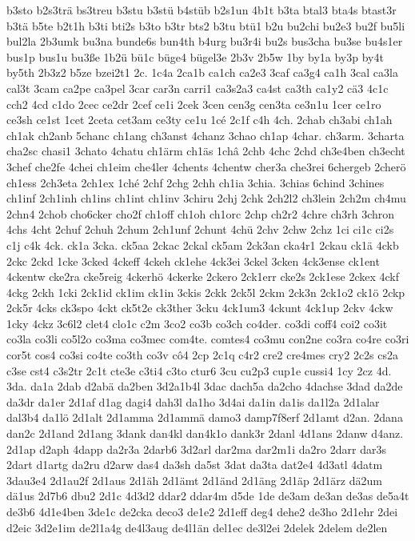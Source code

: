 {b3sto
b2s3trä
bs3treu
b3stu
b3stü
b4stüb
b2s1un
4b1t
b3ta
btal3
bta4s
btast3r
b3tä
b5te
b2t1h
b3ti
bti2s
b3to
b3tr
bts2
b3tu
btü1
b2u
bu2chi
bu2e3
bu2f
bu5li
bul2la
2b3umk
bu3na
bunde6s
bun4th
b4urg
bu3r4i
bu2s
bus3cha
bu3se
bu4s1er
bus1p
bus1u
bu3ße
1b2ü
bü1c
büge4
bügel3e
2b3v
2b5w
1by
by1a
by3p
by4t
by5th
2b3z2
b5ze
bzei2t1
2c.
1c4a
2ca1b
ca1ch
ca2e3
3caf
ca3g4
ca1h
3cal
ca3la
cal3t
3cam
ca2pe
ca3pel
3car
car3n
carri1
ca3s2a3
ca4st
ca3th
ca1y2
cä3
4c1c
cch2
4cd
c1do
2cec
ce2dr
2cef
ce1i
2cek
3cen
cen3g
cen3ta
ce3n1u
1cer
ce1ro
ce3sh
ce1st
1cet
2ceta
cet3am
ce3ty
ce1u
1cé
2c1f
c4h
4ch.
2chab
ch3abi
ch1ah
ch1ak
ch2anb
5chanc
ch1ang
ch3anst
4chanz
3chao
ch1ap
4char.
ch3arm.
3charta
cha2sc
chasi1
3chato
4chatu
ch1ärm
ch1äs
1châ
2chb
4chc
2chd
ch3e4ben
ch3echt
3chef
che2fe
4chei
ch1eim
che4ler
4chents
4chentw
cher3a
che3rei
6chergeb
2cherö
ch1ess
2ch3eta
2ch1ex
1ché
2chf
2chg
2chh
ch1ia
3chia.
3chias
6chind
3chines
ch1inf
2ch1inh
ch1ins
ch1int
ch1inv
3chiru
2chj
2chk
2ch2l2
ch3lein
2ch2m
ch4mu
2chn4
2chob
cho6cker
cho2f
ch1off
ch1oh
ch1orc
2chp
ch2r2
4chre
ch3rh
3chron
4chs
4cht
2chuf
2chuh
2chum
2ch1unf
2chunt
4chü
2chv
2chw
2chz
1ci
ci1c
ci2s
c1j
c4k
4ck.
ck1a
3cka.
ck5aa
2ckac
2ckal
ck5am
2ck3an
cka4r1
2ckau
ck1ä
4ckb
2ckc
2ckd
1cke
3cked
4ckeff
4ckeh
ck1ehe
4ck3ei
3ckel
3cken
4ck3ense
ck1ent
4ckentw
cke2ra
cke5reig
4ckerhö
4ckerke
2ckero
2ck1err
cke2s
2ck1ese
2ckex
4ckf
4ckg
2ckh
1cki
2ck1id
ck1im
ck1in
3ckis
2ckk
2ck5l
2ckm
2ck3n
2ck1o2
ck1ö
2ckp
2ck5r
4cks
ck3spo
4ckt
ck5t2e
ck3ther
3cku
4ck1um3
4ckunt
4ck1up
2ckv
4ckw
1cky
4ckz
3c6l2
clet4
clo1c
c2m
3co2
co3b
co3ch
co4der.
co3di
coff4
coi2
co3it
co3la
co3li
co5l2o
co3ma
co3mec
com4te.
comtes4
co3mu
con2ne
co3ra
co4re
co3ri
cor5t
cos4
co3si
co4te
co3th
co3v
cô4
2cp
2c1q
c4r2
cre2
cre4mes
cry2
2c2s
cs2a
c3se
cst4
c3s2tr
2c1t
cte3e
c3ti4
c3to
ctur6
3cu
cu2p3
cup1e
cussi4
1cy
2cz
4d.
3da.
da1a
2dab
d2abä
da2ben
3d2a1b4l
3dac
dach5a
da2cho
4dachse
3dad
da2de
da3dr
da1er
2d1af
d1ag
dagi4
dah3l
da1ho
3d4ai
da1in
da1is
da1l2a
2d1alar
dal3b4
da1lö
2d1alt
2d1amma
2d1ammä
damo3
damp7f8erf
2d1amt
d2an.
2dana
dan2c
2d1and
2d1ang
3dank
dan4kl
dan4k1o
dank3r
2danl
4d1ans
2danw
d4anz.
2d1ap
d2aph
4dapp
da2r3a
2darb6
3d2arl
dar2ma
dar2m1i
da2ro
2darr
dar3s
2dart
d1artg
da2ru
d2arw
das4
da3sh
da5st
3dat
da3ta
dat2e4
4d3atl
4datm
3dau3e4
2d1au2f
2d1aus
2d1äh
2d1ämt
2d1änd
2d1äng
2d1äp
2d1ärz
dä2um
dä1us
2d7b6
dbu2
2d1c
4d3d2
ddar2
ddar4m
d5de
1de
de3am
de3an
de3as
de5a4t
de3b6
4d1e4ben
3de1c
de2cka
deco3
de1e2
2d1eff
deg4
dehe2
de3ho
2d1ehr
2dei
d2eic
3d2e1im
de2l1a4g
de4l3aug
de4l1än
del1ec
de3l2ei
2delek
2delem
de2len
}
